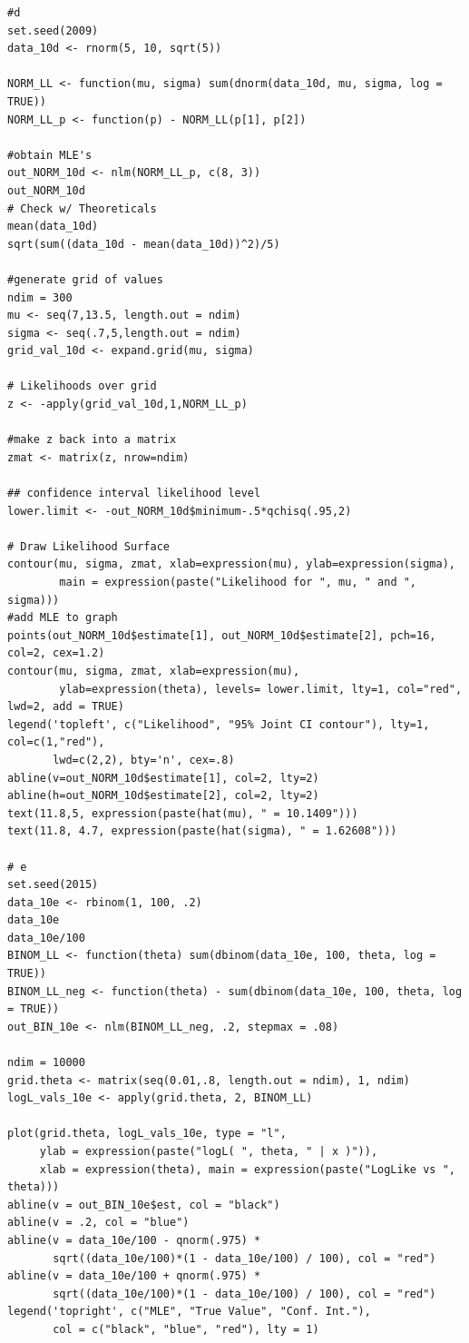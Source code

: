 \documentclass[12pt]{article}\usepackage[]{graphicx}\usepackage[]{color}
\begin{document}
\begin{verbatim}
#d
set.seed(2009)
data_10d <- rnorm(5, 10, sqrt(5))

NORM_LL <- function(mu, sigma) sum(dnorm(data_10d, mu, sigma, log = TRUE))
NORM_LL_p <- function(p) - NORM_LL(p[1], p[2])

#obtain MLE's
out_NORM_10d <- nlm(NORM_LL_p, c(8, 3))
out_NORM_10d
# Check w/ Theoreticals
mean(data_10d)
sqrt(sum((data_10d - mean(data_10d))^2)/5)

#generate grid of values
ndim = 300
mu <- seq(7,13.5, length.out = ndim)
sigma <- seq(.7,5,length.out = ndim)
grid_val_10d <- expand.grid(mu, sigma)

# Likelihoods over grid
z <- -apply(grid_val_10d,1,NORM_LL_p)

#make z back into a matrix
zmat <- matrix(z, nrow=ndim)

## confidence interval likelihood level
lower.limit <- -out_NORM_10d$minimum-.5*qchisq(.95,2)

# Draw Likelihood Surface
contour(mu, sigma, zmat, xlab=expression(mu), ylab=expression(sigma),
        main = expression(paste("Likelihood for ", mu, " and ", sigma)))
#add MLE to graph
points(out_NORM_10d$estimate[1], out_NORM_10d$estimate[2], pch=16, col=2, cex=1.2)
contour(mu, sigma, zmat, xlab=expression(mu), 
        ylab=expression(theta), levels= lower.limit, lty=1, col="red", lwd=2, add = TRUE)
legend('topleft', c("Likelihood", "95% Joint CI contour"), lty=1, col=c(1,"red"), 
       lwd=c(2,2), bty='n', cex=.8)
abline(v=out_NORM_10d$estimate[1], col=2, lty=2)
abline(h=out_NORM_10d$estimate[2], col=2, lty=2)
text(11.8,5, expression(paste(hat(mu), " = 10.1409")))
text(11.8, 4.7, expression(paste(hat(sigma), " = 1.62608")))

# e
set.seed(2015)
data_10e <- rbinom(1, 100, .2)
data_10e
data_10e/100
BINOM_LL <- function(theta) sum(dbinom(data_10e, 100, theta, log = TRUE))
BINOM_LL_neg <- function(theta) - sum(dbinom(data_10e, 100, theta, log = TRUE))
out_BIN_10e <- nlm(BINOM_LL_neg, .2, stepmax = .08)

ndim = 10000
grid.theta <- matrix(seq(0.01,.8, length.out = ndim), 1, ndim)
logL_vals_10e <- apply(grid.theta, 2, BINOM_LL)

plot(grid.theta, logL_vals_10e, type = "l", 
     ylab = expression(paste("logL( ", theta, " | x )")),
     xlab = expression(theta), main = expression(paste("LogLike vs ", theta)))
abline(v = out_BIN_10e$est, col = "black")
abline(v = .2, col = "blue")
abline(v = data_10e/100 - qnorm(.975) * 
       sqrt((data_10e/100)*(1 - data_10e/100) / 100), col = "red")
abline(v = data_10e/100 + qnorm(.975) * 
       sqrt((data_10e/100)*(1 - data_10e/100) / 100), col = "red")
legend('topright', c("MLE", "True Value", "Conf. Int."), 
       col = c("black", "blue", "red"), lty = 1)


\end{verbatim}
\end{document}
